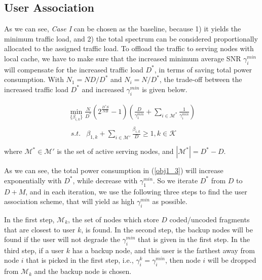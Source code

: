 \documentclass[journal,12pt,onecolumn]{IEEEtran}
\begin{document}
\subsection{User Association}
As we can see, \emph{Case I} can be chosen as the baseline, because 1) it yields the minimum traffic load, and 2) the total spectrum can be considered proportionally allocated to the assigned traffic load. To offload the traffic to serving nodes with local cache, we have to make sure that the increased minimum average SNR ${\gamma_i^{min}}$ will compensate for the increased traffic load $D^*$, in terms of saving total power consumption. With $N_1=ND/D^*$ and $N_i=N/D^*$, the trade-off between the increased traffic load $D^*$ and increased ${\gamma_i^{min}}$ is given below.

\begin{equation}\label{obj1_3}
\begin{array}{l}
\mathop {\min }\limits_{\{\beta_{i,k}\}} \frac{N}{D^*}(2^{\frac{D^*S}{NB}}-1)(\frac{D}{\gamma_1^{min}}+\sum\limits_{i\in\mathcal{M}^*}\frac{1}{\gamma_i^{min}}) \\
\begin{array}{*{20}{l}}
{s.t.}&\beta_{1,k}+\sum\limits_{i\in\mathcal{M'}}\frac{\beta_{i,k}}{D}\ge 1, k\in\mathcal{K}\\
\end{array}
\end{array}
\end{equation}
where $\mathcal{M}^*\in\mathcal{M}'$ is the set of active serving nodes, and $|\mathcal{M}^*|=D^*-D$.\

As we can see, the total power consumption in (\ref{obj1_3}) will increase exponentially with $D^*$, while decrease with ${\gamma_1^{min}}$. So we iterate $D^*$ from $D$ to $D+M$, and in each iteration, we use the following three steps to find the user association scheme, that will yield as high $\gamma_i^{min}$ as possible. 

In the first step, $\mathcal{M}_k$, the set of nodes which store $D$ coded/uncoded fragments that are closest to user $k$, is found. In the second step, the backup nodes will be found if the user will not degrade the $\gamma_i^{min}$ that is given in the first step. In the third step, if a user $k$ has a backup node, and this user is the farthest away from node $i$ that is picked in the first step, i.e., $\gamma_i^k=\gamma_i^{min}$, then node $i$ will be dropped from $\mathcal{M}_k$ and the backup node is chosen.
\end{document}
